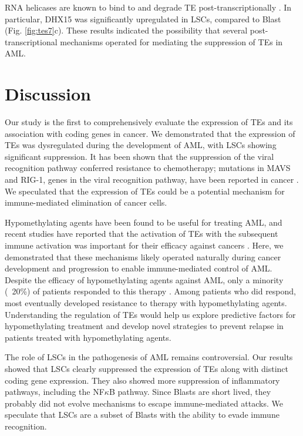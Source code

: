 RNA helicases are known to bind to and degrade TE post-transcriptionally \cite{Goodier2016,Goodier2012,Bryk2001, Ott2014,Taylor2013, Wu-Scharf2000}. In particular, DHX15 was significantly upregulated in LSCs, compared to Blast (Fig. \ref{fig:tes7}c). These results indicated the possibility that several post-transcriptional mechanisms operated for mediating the suppression of TEs in AML.

\section{Discussion}
Our study is the first to comprehensively evaluate the expression of TEs and its association with coding genes in cancer. We demonstrated that the expression of TEs was dysregulated during the development of AML, with LSCs showing significant suppression. It has been shown that the suppression of the viral recognition pathway conferred resistance to chemotherapy; mutations in MAVS and RIG-1, genes in the viral recognition pathway, have been reported in cancer \cite{Ranoa2016}. We speculated that the expression of TEs could be a potential mechanism for immune-mediated elimination of cancer cells.

Hypomethylating agents have been found to be useful for treating AML, and recent studies have reported that the activation of TEs with the subsequent immune activation was important for their efficacy against cancers \cite{Chiappinelli2015, Roulois2015}. Here, we demonstrated that these mechanisms likely operated naturally during cancer development and progression to enable immune-mediated control of AML. Despite the efficacy of hypomethylating agents against AML, only a minority (~20\%) of patients responded to this therapy \cite{Yun2016}. Among patients who did respond, most eventually developed resistance to therapy with hypomethylating agents. Understanding the regulation of TEs would help us explore predictive factors for hypomethylating treatment and develop novel strategies to prevent relapse in patients treated with hypomethylating agents.

The role of LSCs in the pathogenesis of AML remains controversial. Our results showed that LSCs clearly suppressed the expression of TEs along with distinct coding gene expression. They also showed more suppression of inflammatory pathways, including the NF$\kappa$B pathway. Since Blasts are short lived, they probably did not evolve mechanisms to escape immune-mediated attacks. We speculate that LSCs are a subset of Blasts with the ability to evade immune recognition.

